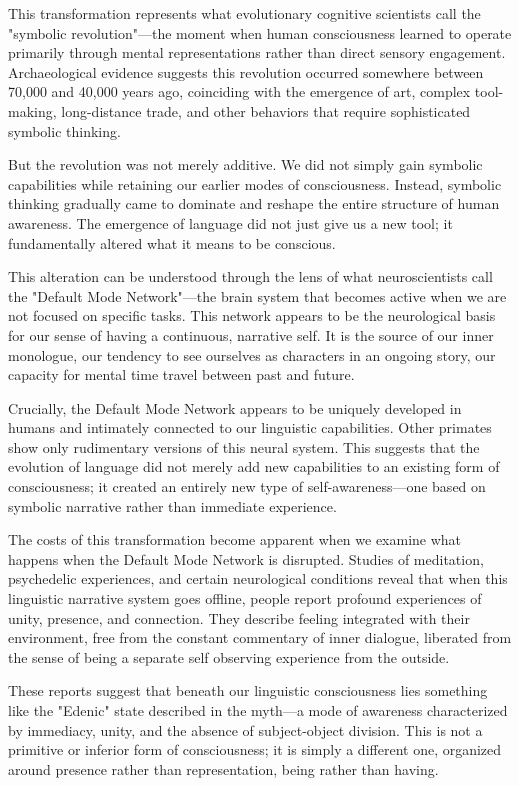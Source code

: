 This transformation represents what evolutionary cognitive scientists call the "symbolic revolution"—the moment when human consciousness learned to operate primarily through mental representations rather than direct sensory engagement. Archaeological evidence suggests this revolution occurred somewhere between 70,000 and 40,000 years ago, coinciding with the emergence of art, complex tool-making, long-distance trade, and other behaviors that require sophisticated symbolic thinking.

But the revolution was not merely additive. We did not simply gain symbolic capabilities while retaining our earlier modes of consciousness. Instead, symbolic thinking gradually came to dominate and reshape the entire structure of human awareness. The emergence of language did not just give us a new tool; it fundamentally altered what it means to be conscious.

This alteration can be understood through the lens of what neuroscientists call the "Default Mode Network"—the brain system that becomes active when we are not focused on specific tasks. This network appears to be the neurological basis for our sense of having a continuous, narrative self. It is the source of our inner monologue, our tendency to see ourselves as characters in an ongoing story, our capacity for mental time travel between past and future.

Crucially, the Default Mode Network appears to be uniquely developed in humans and intimately connected to our linguistic capabilities. Other primates show only rudimentary versions of this neural system. This suggests that the evolution of language did not merely add new capabilities to an existing form of consciousness; it created an entirely new type of self-awareness—one based on symbolic narrative rather than immediate experience.

The costs of this transformation become apparent when we examine what happens when the Default Mode Network is disrupted. Studies of meditation, psychedelic experiences, and certain neurological conditions reveal that when this linguistic narrative system goes offline, people report profound experiences of unity, presence, and connection. They describe feeling integrated with their environment, free from the constant commentary of inner dialogue, liberated from the sense of being a separate self observing experience from the outside.

These reports suggest that beneath our linguistic consciousness lies something like the "Edenic" state described in the myth—a mode of awareness characterized by immediacy, unity, and the absence of subject-object division. This is not a primitive or inferior form of consciousness; it is simply a different one, organized around presence rather than representation, being rather than having.

